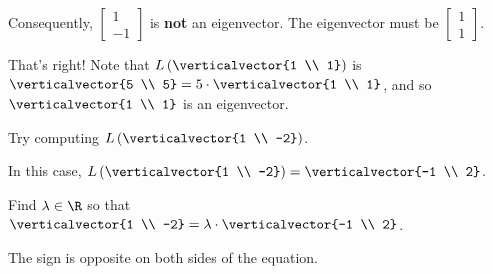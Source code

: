 \documentclass{ximera}
\begin{document}
\begin{question}
\begin{solution}
\begin{hint}
\begin{question}
        \begin{solution}
          \begin{multiple-choice}
          \end{multiple-choice}
        \end{solution}

        Consequently,  $\begin{bmatrix} 1 \\ -1 \end{bmatrix}$ is \textbf{not} an eigenvector.  The eigenvector must be $\begin{bmatrix} 1 \\ 1\end{bmatrix}$.
      \end{question}
    \end{hint}

    \begin{multiple-choice}
    \end{multiple-choice}
  \end{solution}
  
  That's right!  Note that $L\left( \verticalvector{1 \\ 1} \right)$ is
  $\verticalvector{5 \\ 5} = 5 \cdot \verticalvector{1 \\ 1}$, and so
  $\verticalvector{1 \\ 1}$ is an eigenvector.

  \begin{solution}
    \begin{hint}
      Try computing $L\left( \verticalvector{1 \\ -2} \right)$.
    \end{hint}

    \begin{hint}
      In this case, $L\left( \verticalvector{1 \\ -2} \right) = \verticalvector{-1 \\ 2}$.
    \end{hint}

    \begin{hint}
      \begin{question}
        Find $\lambda \in \R$ so that $\verticalvector{1 \\ -2} = \lambda \cdot \verticalvector{-1 \\ 2}$.
        \begin{solution}
          \begin{hint}
            The sign is opposite on both sides of the equation.
          \end{hint}


\end{solution}
\end{question}
\end{hint}
\end{solution}
\end{question}
\end{document}
